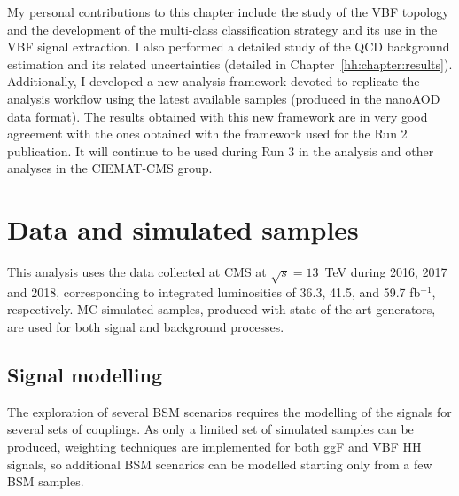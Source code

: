 \documentclass[../main.tex]{subfiles}
\begin{document}
My personal contributions to this chapter include the study of the VBF topology and the development of the multi-class classification strategy and its use in the VBF signal extraction. I also performed a detailed study of the QCD background estimation and its related uncertainties (detailed in Chapter~\ref{hh:chapter:results}). Additionally, I developed a new analysis framework devoted to replicate the \hhbbtt{} analysis workflow using the latest available samples (produced in the nanoAOD data format). The results obtained with this new framework are in very good agreement with the ones obtained with the framework used for the Run 2 publication. It will continue to be used during Run 3 in the \hhbbtt{} analysis and other analyses in the CIEMAT-CMS group.



\section{Data and simulated samples}

This analysis uses the data collected at CMS at $\sqrt{s}=13$~TeV during 2016, 2017 and 2018, corresponding to integrated luminosities of 36.3, 41.5, and 59.7 fb${}^{-1}$, respectively. MC simulated samples, produced with state-of-the-art generators, are used for both signal and background processes.

\subsection{Signal modelling}
\label{hh:subsec:signal_modelling}


The exploration of several BSM scenarios requires the modelling of the signals for several sets of couplings. As only a limited set of simulated samples can be produced, weighting techniques are implemented for both ggF and VBF HH signals, so additional BSM scenarios can be modelled starting only from a few BSM samples. 
\end{document}
